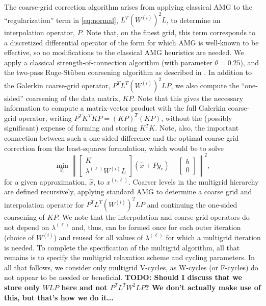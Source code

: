 The coarse-grid correction algorithm arises from applying classical
AMG to the ``regularization'' term in \eqref{eq:normal},
$L^T\left(W^{(i)}\right)^2L$, to determine an interpolation operator,
$P$.  Note that, on the finest grid, this term corresponds to a
discretized differential operator of the form for which AMG is
well-known to be effective, so no modifications to the classical AMG
heuristics are needed.  We apply a classical strength-of-connection
algorithm (with parameter $\theta = 0.25$), and the two-pass
Ruge-St\"uben coarsening algorithm as described
in \cite{JWRuge_KStuben_1987a}.  In addition to the Galerkin
coarse-grid operator, $P^TL^T\left(W^{(i)}\right)^2LP$, we also
compute the ``one-sided'' coarsening of the data matrix, $KP$.  Note
that this gives the necessary information to compute a matrix-vector
product with the full Galerkin coarse-grid operator, writing $P^TK^TKP
= (KP)^T(KP)$, without the (possibly significant) expense of forming
and storing $K^TK$.  Note, also, the important connection between such
a one-sided difference and the optimal coarse-grid correction from the
least-squares formulation, which would be to solve
\[
\min_{y_c}\left\| \left[\begin{array}{c} K \\ 
      \lambda^{(\ell)}W^{(i)}L\end{array}\right](\hat{x}+Py_c) - \left[\begin{array}{c} b \\ 0 \end{array}\right]\right\|^2,
\]
for a given approximation, $\hat{x}$, to $x^{(i,\ell)}$.  Coarser
levels in the multigrid hierarchy are defined recursively, applying
standard AMG to determine a coarse grid and interpolation operator for
$P^TL^T\left(W^{(i)}\right)^2LP$ and continuing the one-sided
coarsening of $KP$.  We note that the interpolation and coarse-grid
operators do not depend on $\lambda^{(\ell)}$ and, thus, can be formed
once for each outer iteration (choice of $W^{(i)}$) and reused for all
values of $\lambda^{(\ell)}$ for which a multigrid iteration is
needed.  To complete the specification of the multigrid algorithm, all
that remains is to specify the multigrid relaxation scheme and cycling
parameters.  In all that follows, we consider only multigrid V-cycles,
as W-cycles (or F-cycles) do not appear to be needed or beneficial.
{\bf TODO: Should I discuss that we store only $WLP$ here and not
$P^TL^TW^2LP$?  We don't actually make use of this, but that's how we
do it...}

